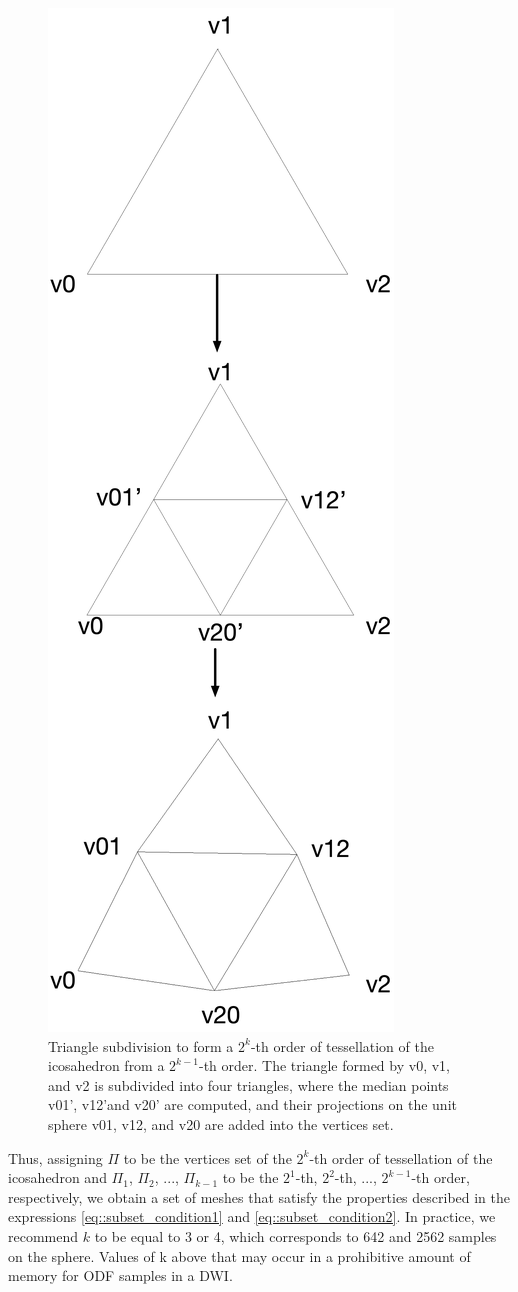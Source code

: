 \documentclass[twoside,twocolumn,10pt]{article}
\begin{document}
\begin{figure}[ht]
    \centering
    \includegraphics[width=.50\linewidth, angle=0]{figs/icosahedron_example/ico_subdivision_V.png}
    \caption{Triangle subdivision to form a $2^k$-th order of tessellation of the icosahedron from a $2^{k-1}$-th order. The triangle formed by v0, v1, and v2 is subdivided into four triangles, where the median points v01', v12'and v20' are computed, and their projections on the unit sphere v01, v12, and v20 are added into the vertices set.
    }
    \label{fig::subdivision_icosahedron}
\end{figure}



Thus, assigning $\Pi$ to be the vertices set of the $2^k$-th order of tessellation of the icosahedron and $\Pi_1$, $\Pi_2$, ..., $\Pi_{k-1}$ to be the $2^{1}$-th, $2^{2}$-th, ..., $2^{k-1}$-th order, respectively, we obtain a set of meshes that satisfy the properties described in the expressions \ref{eq::subset_condition1} and \ref{eq::subset_condition2}. In practice, we recommend $k$ to be equal to 3 or 4, which corresponds to 642 and 2562 samples on the sphere. Values of k above that may occur in a prohibitive amount of memory for ODF samples in a DWI.
\end{document}
